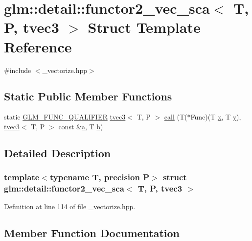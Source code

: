 \hypertarget{structglm_1_1detail_1_1functor2__vec__sca_3_01_t_00_01_p_00_01tvec3_01_4}{}\section{glm\+::detail\+::functor2\+\_\+vec\+\_\+sca$<$ T, P, tvec3 $>$ Struct Template Reference}
\label{structglm_1_1detail_1_1functor2__vec__sca_3_01_t_00_01_p_00_01tvec3_01_4}


{\ttfamily \#include $<$\+\_\+vectorize.\+hpp$>$}

\subsection*{Static Public Member Functions}
\begin{DoxyCompactItemize}
\item 
static \mbox{\hyperlink{setup_8hpp_a33fdea6f91c5f834105f7415e2a64407}{G\+L\+M\+\_\+\+F\+U\+N\+C\+\_\+\+Q\+U\+A\+L\+I\+F\+I\+ER}} \mbox{\hyperlink{structglm_1_1tvec3}{tvec3}}$<$ T, P $>$ \mbox{\hyperlink{structglm_1_1detail_1_1functor2__vec__sca_3_01_t_00_01_p_00_01tvec3_01_4_a9abcc48de3dedce9cbb07d47d520dbc5}{call}} (T($\ast$Func)(T \mbox{\hyperlink{glad_8h_a92d0386e5c19fb81ea88c9f99644ab1d}{x}}, T \mbox{\hyperlink{glad_8h_a66ddd433d2cacfe27f5906b7e86faeed}{y}}), \mbox{\hyperlink{structglm_1_1tvec3}{tvec3}}$<$ T, P $>$ const \&\mbox{\hyperlink{glad_8h_ac8729153468b5dcf13f971b21d84d4e5}{a}}, T \mbox{\hyperlink{glad_8h_a6eba317e3cf44d6d26c04a5a8f197dcb}{b}})
\end{DoxyCompactItemize}


\subsection{Detailed Description}
\subsubsection*{template$<$typename T, precision P$>$\newline
struct glm\+::detail\+::functor2\+\_\+vec\+\_\+sca$<$ T, P, tvec3 $>$}



Definition at line 114 of file \+\_\+vectorize.\+hpp.



\subsection{Member Function Documentation}
\mbox{\label{structglm_1_1detail_1_1functor2__vec__sca_3_01_t_00_01_p_00_01tvec3_01_4_a9abcc48de3dedce9cbb07d47d520dbc5}} 
